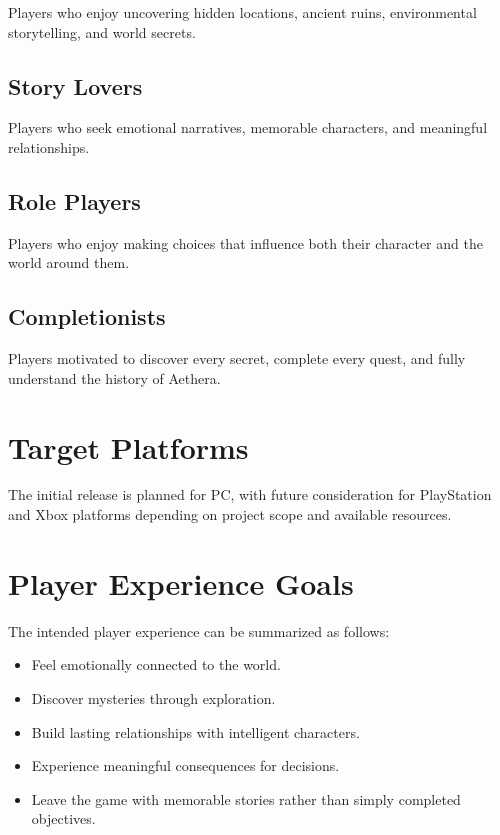 Players who enjoy uncovering hidden locations, ancient ruins, environmental storytelling, and world secrets.

\subsection{Story Lovers}

Players who seek emotional narratives, memorable characters, and meaningful relationships.

\subsection{Role Players}

Players who enjoy making choices that influence both their character and the world around them.

\subsection{Completionists}

Players motivated to discover every secret, complete every quest, and fully understand the history of Aethera.

\section{Target Platforms}

The initial release is planned for PC, with future consideration for PlayStation and Xbox platforms depending on project scope and available resources.

\section{Player Experience Goals}

The intended player experience can be summarized as follows:

\begin{itemize}
    \item Feel emotionally connected to the world.
    \item Discover mysteries through exploration.
    \item Build lasting relationships with intelligent characters.
    \item Experience meaningful consequences for decisions.
    \item Leave the game with memorable stories rather than simply completed objectives.
\end{itemize}

